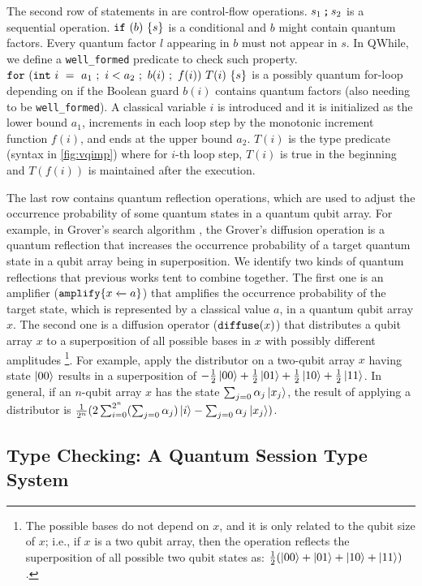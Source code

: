 The second row of statements in  are control-flow operations.
${s_1}\,\texttt{;}\,{s_2}$ is a sequential operation.
$\texttt{if}~{(b)}~{\{s\}}$ is a conditional and $b$ might contain quantum factors.
Every quantum factor $l$ appearing in $b$ must not appear in $s$.
In QWhile, we define a \texttt{well\_formed} predicate to check such property.
$\texttt{for}~{(\texttt{int}~{i}~=~{a_1}~;~i<a_2~;~b(i)~;~f(i))}~{T(i)}~{\{s\}}$ is a possibly quantum for-loop depending on if the Boolean guard $b(i)$ contains quantum factors (also needing to be \texttt{well\_formed}).
A classical variable $i$ is introduced and it is initialized as the lower bound $a_1$, increments in each loop step by the monotonic increment function $f(i)$, and ends at the upper bound $a_2$.
$T(i)$ is the type predicate (syntax in \cref{fig:vqimp}) where for $i$-th loop step,
$T(i)$ is true in the beginning and $T(f(i))$ is maintained after the execution.

The last row contains quantum reflection operations,
which are used to adjust the occurrence probability of
some quantum states in a quantum qubit array.
For example, in Grover's search algorithm \cite{grover1996},
the Grover's diffusion operation is a quantum reflection
that increases the occurrence probability of a target quantum state in a qubit array being in superposition.
We identify two kinds of quantum reflections that previous works tent to combine together.
The first one is an amplifier ($\texttt{amplify}\{{x} \xleftarrow{} {a}\}$)
that amplifies the occurrence probability of the target state,
which is represented by a classical value $a$,
in a quantum qubit array $x$.
The second one is a diffusion operator ($\texttt{diffuse}(x)$)
that distributes a qubit array $x$ to a superposition of 
all possible bases in $x$ with possibly different amplitudes \footnote{The possible bases do not depend on $x$, and it is only related to the qubit size of $x$; i.e., if $x$ is a two qubit array, then the operation reflects the superposition of all possible two qubit states as: $\frac{1}{2}(\left\vert{00}\right\rangle+\left\vert{01}\right\rangle+\left\vert{10}\right\rangle+\left\vert{11}\right\rangle)$.  }.
For example, apply the distributor on a two-qubit array $x$ having state $\left\vert{00}\right\rangle$
results in a superposition of $-\frac{1}{2}\left\vert{00}\right\rangle+\frac{1}{2}\left\vert{01}\right\rangle+\frac{1}{2}\left\vert{10}\right\rangle+\frac{1}{2}\left\vert{11}\right\rangle$.
In general, if an $n$-qubit array $x$ has the state $\sum_{j=0}\alpha_j\left\vert{x_j}\right\rangle$,
the result of applying a distributor is $\frac{1}{2^{n}}(2\sum_{i=0}^{2^n}(\sum_{j=0}\alpha_j)\left\vert{i}\right\rangle - \sum_{j=0}\alpha_j\left\vert{x_j}\right\rangle)$.

\subsection{Type Checking: A Quantum Session Type System}\label{sec:typesystem}


